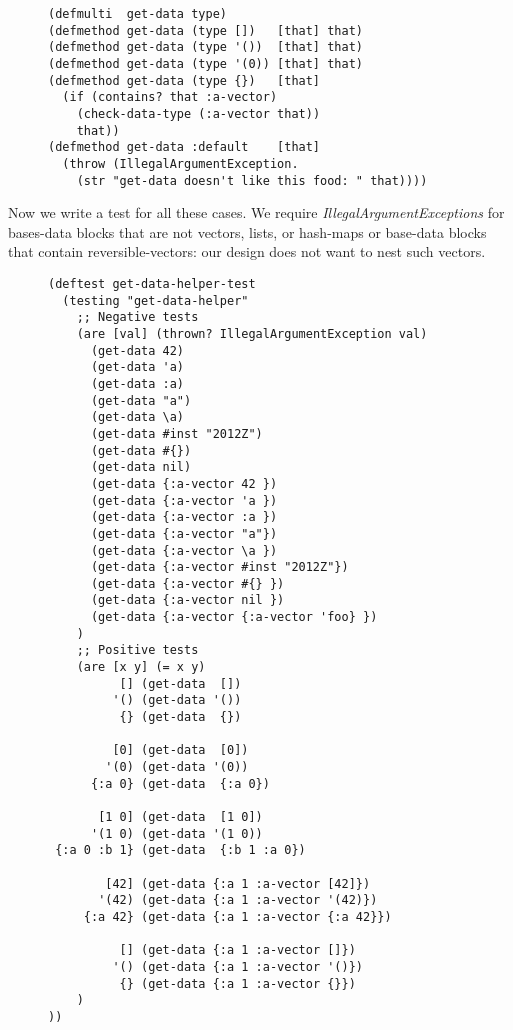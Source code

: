 \documentclass[11pt]{article}
\begin{document}
\begin{figure}[H]
\label{get-data-helper}
\begin{verbatim}
(defmulti  get-data type)
(defmethod get-data (type [])   [that] that)
(defmethod get-data (type '())  [that] that)
(defmethod get-data (type '(0)) [that] that)
(defmethod get-data (type {})   [that]
  (if (contains? that :a-vector)
    (check-data-type (:a-vector that))
    that))
(defmethod get-data :default    [that]
  (throw (IllegalArgumentException.
    (str "get-data doesn't like this food: " that))))
\end{verbatim}
\end{figure}

Now we write a test for all these cases. We require
\emph{IllegalArgumentExceptions} for bases-data blocks that are not vectors,
lists, or hash-maps or base-data blocks that contain
reversible-vectors: our design does not want to nest such vectors.

\begin{figure}[H]
\label{test-get-data-helper}
\begin{verbatim}
(deftest get-data-helper-test
  (testing "get-data-helper"
    ;; Negative tests
    (are [val] (thrown? IllegalArgumentException val)
      (get-data 42)
      (get-data 'a)
      (get-data :a)
      (get-data "a")
      (get-data \a)
      (get-data #inst "2012Z")
      (get-data #{})
      (get-data nil)
      (get-data {:a-vector 42 })
      (get-data {:a-vector 'a })
      (get-data {:a-vector :a })
      (get-data {:a-vector "a"})
      (get-data {:a-vector \a })
      (get-data {:a-vector #inst "2012Z"})
      (get-data {:a-vector #{} })
      (get-data {:a-vector nil })
      (get-data {:a-vector {:a-vector 'foo} })
    )
    ;; Positive tests
    (are [x y] (= x y)
          [] (get-data  [])
         '() (get-data '())
          {} (get-data  {})

         [0] (get-data  [0])
        '(0) (get-data '(0))
      {:a 0} (get-data  {:a 0})

       [1 0] (get-data  [1 0])
      '(1 0) (get-data '(1 0))
 {:a 0 :b 1} (get-data  {:b 1 :a 0})

        [42] (get-data {:a 1 :a-vector [42]})
       '(42) (get-data {:a 1 :a-vector '(42)})
     {:a 42} (get-data {:a 1 :a-vector {:a 42}})

          [] (get-data {:a 1 :a-vector []})
         '() (get-data {:a 1 :a-vector '()})
          {} (get-data {:a 1 :a-vector {}})
    )
))
\end{verbatim}
\end{figure}
\end{document}
